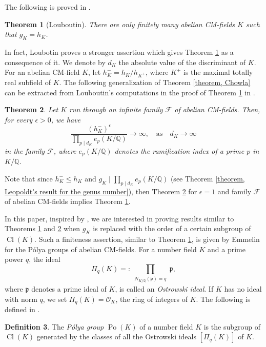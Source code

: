\documentclass[12pt]{amsart}
\newtheorem{theorem}{Theorem}[section]
\theoremstyle{definition}
\newtheorem{definition}[theorem]{Definition}
\numberwithin{equation}{section}
\DeclareMathOperator{\Po}{Po}
\DeclareMathOperator{\Cl}{Cl}
\begin{document}
The following is proved in \cite[Theorem 1]{Louboutin}.
\begin{theorem} [{Louboutin}] \label{theorem, Louboutin0}
There are only finitely many abelian CM-fields $K$ such that $g_K=h_K$.
\end{theorem}

In fact, Loubotin proves a stronger assertion which gives Theorem \ref{theorem, Louboutin0} as a consequence of it. We denote by $d_K$ the absolute value of the discriminant of $K$. 
For an abelian CM-field $K$, let $h_K^-=h_K/h_{K^+}$, where $K^+$ is the maximal totally real subfield of $K$. %
The following generalization of Theorem \ref{theorem, Chowla} can be extracted from Louboutin's computations in the proof of Theorem \ref{theorem, Louboutin0} in \cite{Louboutin}.

\begin{theorem} \label{theorem, Louboutin00}
Let $K$ run through an infinite family $\mathcal{F}$ of abelian CM-fields. 
Then, for every $\epsilon >0$, we have
\begin{equation}
	\label{L-Chowla}
	\frac{(h_K^-)^{\epsilon}}{\prod_{p \mid d_K}e_p(K/\mathbb{Q})} \rightarrow \infty,  \quad \text{as} \quad d_K \rightarrow \infty
\end{equation} 
in the family $\mathcal{F}$, where $e_p(K/\mathbb{Q})$ denotes the ramification index of a prime $p$ in $K/\mathbb{Q}$. 
\end{theorem} Note that since $h_K^-\leq h_K$ and
$g_K\mid \prod_{p \mid d_K}e_p(K/\mathbb{Q})$ (see Theorem \ref{theorem, Leopoldt's result for the genus number}), then Theorem \ref{theorem, Louboutin00} for $\epsilon=1$ and family $\mathcal{F}$ of abelian CM-fields implies  Theorem \ref{theorem, Louboutin0}.
\medskip\par


In this paper, inspired by \cite{Emmelin}, we are interested in proving results similar to Theorems \ref{theorem, Louboutin0} and \ref{theorem, Louboutin00}  when $g_K$ is replaced with the order of a certain subgroup of $\Cl(K)$. 
Such a finiteness assertion, similar to Theorem \ref{theorem, Louboutin0},
is given by Emmelin \cite[Corollary 3.15]{Emmelin} for the P\'olya groups of abelian CM-fields.
For a number field $K$ and a prime power $q$, the ideal
$$\Pi_q(K)=:\prod_{\substack{N_{K/ \mathbb{Q}}(\mathfrak{p})=q}} \mathfrak{p}, $$
where $\mathfrak{p}$ denotes a prime ideal of $K$, is called an  
\emph{Ostrowski ideal}. If $K$ has no ideal with norm $q$, we set $\Pi_{q}(K)=\mathcal{O}_K$, the ring of integers of $K$.
The following is defined in \cite[Chapter II, $\S$3]{Cahen-Chabert's book}.
\begin{definition} 
\label{Polya}
	The \emph{P\'olya group} $\Po(K)$ of a number field $K$ is the subgroup of $\Cl(K)$ generated by the classes of all the Ostrowski ideals
$[\Pi_{q}(K)]$ of $K$.
\end{definition}
\end{document}
